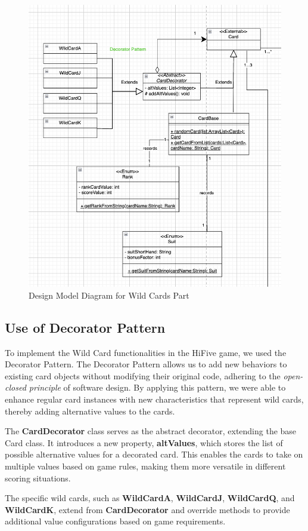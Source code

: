\documentclass[a4paper, 12pt]{report}
\begin{document}
    \begin{figure}[htbp]
        \centering
        \includegraphics[width=0.8\linewidth]{Cards.png}
        \caption{Design Model Diagram for Wild Cards Part}
        \label{fig:enter-label}
    \end{figure}

    \subsection{Use of Decorator Pattern}
    To implement the Wild Card functionalities in the HiFive game, we used the Decorator Pattern. The Decorator Pattern allows us to add new behaviors to existing card objects without modifying their original code, adhering to the \textit{open-closed principle} of software design. By applying this pattern, we were able to enhance regular card instances with new characteristics that represent wild cards, thereby adding alternative values to the cards.

    The \textbf{CardDecorator} class serves as the abstract decorator, extending the base Card class. It introduces a new property, \textbf{altValues}, which stores the list of possible alternative values for a decorated card. This enables the cards to take on multiple values based on game rules, making them more versatile in different scoring situations.\textbf{}

    The specific wild cards, such as \textbf{WildCardA}, \textbf{WildCardJ}, \textbf{WildCardQ}, and \textbf{WildCardK}, extend from \textbf{CardDecorator} and override methods to provide additional value configurations based on game requirements.
\end{document}
